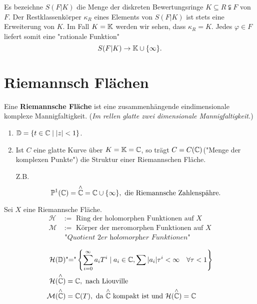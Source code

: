 \begin{bemerkungnr}
    Es bezeichne $S(F|K)$ die Menge der diskreten Bewertungsringe $K \subseteq R \subsetneqq F$ von $F$.
    Der Restklassenkörper $\kappa_R$ eines Elements von $S(F|K)$ ist stets eine Erweiterung von $K$.
    Im Fall $K = \mathbb{K}$ werden wir sehen, dass $\kappa_R = K$. Jedes $\varphi \in F$ liefert somit eine "rationale Funktion"
    $$ S(F|K) \to \mathbb{K} \cup \{\infty\}. $$
\end{bemerkungnr}

\section{Riemannsch Flächen}
\begin{definition}
    Eine \textbf{Riemannsche Fläche} ist eine zusammenhängende eindimensionale komplexe Mannigfaltigkeit.
    (\textit{Im rellen glatte zwei dimensionale Mannigfaltigkeit.})
\end{definition}

\begin{beispiel}
    \begin{enumerate}[label=\alph*.)]
        \item $\mathbb{D} = \{t \in \mathbb{C} \mid |z| < 1\}$.
        \item Ist $C$ eine glatte Kurve über $K = \mathbb{K} = \mathbb{C}$, so trägt $C = C(\mathbb{C})$("Menge der komplexen Punkte")
        die Struktur einer Riemannschen Fläche.

        Z.B. $$ \mathbb{P}^1(\mathbb{C}) = \overset{\wedge}{\mathbb{C}} = \mathbb{C} \cup \{\infty\}, \text{ die Riemannsche Zahlenspähre.}$$
    \end{enumerate}
\end{beispiel}

\begin{definition}
    Sei $X$ eine Riemannsche Fläche.
    \begin{align*}
        \mathcal{H} &:= \text{ Ring der holomorphen Funktionen auf }X\\
        \mathcal{M} &:= \text{ Körper der meromorphen Funktionen auf }X \\
        &\textit{ "Quotient 2er holomorpher Funktionen"}
    \end{align*}
\end{definition}

\begin{beispiel}
    \begin{align*}
        \mathcal{H}(\mathbb{D}) & \text{"="} \left\{\sum\limits_{i=0}^\infty a_i T^i \mid a_i \in \mathbb{C}, 
            \sum|a_i|\tau^i < \infty \quad \forall \tau < 1\right\}\\
        \mathcal{H}(\overset{\wedge}{\mathbb{C}}) & = \mathbb{C}, \text{ nach Liouville}\\
        \mathcal{M}(\overset{\wedge}{\mathbb{C}}) & = \mathbb{C}(T), \text{ da } \overset{\wedge}{\mathbb{C}} \text{ kompakt ist und }
            \mathcal{H}(\overset{\wedge}{\mathbb{C}}) = \mathbb{C}
    \end{align*}
\end{beispiel}

